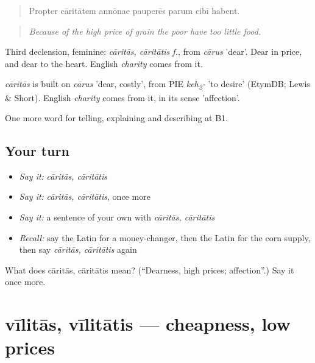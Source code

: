\begin{quote}
Propter cāritātem annōnae pauperēs parum cibī habent.
\end{quote}

\begin{quote}
\emph{Because of the high price of grain the poor have too little food.}
\end{quote}

Third declension, feminine: \emph{cāritās, cāritātis f.}, from \emph{cārus} 'dear'. Dear in price, and dear to the heart. English \emph{charity} comes from it.

\begin{cousinweb}
\emph{cāritās} is built on \emph{cārus} 'dear, costly', from PIE \emph{keh\textsubscript{2}-} 'to desire' (EtymDB; Lewis \& Short). English \emph{charity} comes from it, in its sense 'affection'.
\end{cousinweb}

\begin{grammarlens}[title={What you've built}]
One more word for telling, explaining and describing at B1.
\end{grammarlens}

\subsection*{Your turn}
\begin{itemize}
\raggedright
  \item \emph{Say it:} \emph{cāritās, cāritātis}
  \item \emph{Say it:} \emph{cāritās, cāritātis}, once more
  \item \emph{Say it:} a sentence of your own with \emph{cāritās, cāritātis}
  \item \emph{Recall:} say the Latin for a money-changer, then the Latin for the corn supply, then say \emph{cāritās, cāritātis} again
\end{itemize}

\begin{tcolorbox}[breakable,colback=teal!4,colframe=teal!35!black,title={Before you move on}]
What does cāritās, cāritātis mean? (\textquotedblleft{}Dearness, high prices; affection\textquotedblright{}.) Say it once more.
\end{tcolorbox}
\section[vīlitās, vīlitātis]{vīlitās, vīlitātis — cheapness, low prices}


